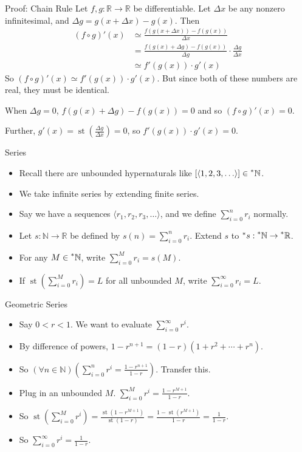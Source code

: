 \documentclass{beamer}
\theoremstyle{plain}
\theoremstyle{definition}
\newcommand{\stp}[1]{\st\left(#1\right)}
\newcommand{\reals}{\mathbb{R}}
\newcommand{\hreals}{\prescript{*}{}{\mathbb{R}}}
\newcommand{\nats}{\mathbb{N}}
\newcommand{\hnats}{\prescript{*}{}{\mathbb{N}}}
\newcommand{\hr}[1]{\prescript{*}{}{#1}}
\DeclareMathOperator{\st}{st}
\begin{document}
\begin{frame}{Proof: Chain Rule}
Let $f,g: \reals \to \reals$ be differentiable. Let $\Delta x$ be any nonzero infinitesimal, and $\Delta g = g(x + \Delta x) - g(x)$. Then
\begin{align*}
(f \circ g)'(x) &\simeq \frac{f(g(x + \Delta x)) - f(g(x))}{\Delta x}  \\
	&= \frac{f(g(x) + \Delta g) - f(g(x))}{\Delta g} \cdot \frac{\Delta g}{\Delta x} \\ 
	&\simeq f'(g(x))\cdot g'(x)
\end{align*}
So $(f \circ g)'(x) \simeq f'(g(x)) \cdot g'(x)$. But since both of these numbers are real, they must be identical.
\vspace{2mm}

When $\Delta g = 0$, $f(g(x) + \Delta g) - f(g(x)) = 0$ and so $(f \circ g)'(x) = 0$. 
\vspace{1mm}

Further, $g'(x) = \stp{\frac{\Delta g}{\Delta x}} = 0$, so $f'(g(x)) \cdot g'(x) = 0$.
\end{frame}

\begin{frame}{Series}
\begin{itemize}
\item Recall there are unbounded hypernaturals like $[\langle 1, 2, 3, \ldots \rangle] \in \hnats$.
\item We take infinite series by extending finite series.
\item Say we have a sequences $\langle r_1, r_2, r_3, \ldots \rangle$, and we define $\sum_{i=0}^n r_i$ normally.
\item Let $s:\nats \to \reals$ be defined by $s(n) = \sum_{i=0}^n r_i$. Extend $s$ to $\hr{s}:\hnats \to \hreals$.
\item For any $M \in \hnats$, write $\sum_{i=0}^M r_i = s(M)$.
\item If $\stp{\sum_{i=0}^M r_i} = L$ for all unbounded $M$, write $\sum_{i=0}^\infty r_i = L$.
\end{itemize}
\end{frame}

\begin{frame}{Geometric Series}
\begin{itemize}
\setlength{\itemsep}{8pt}
\item Say $0 < r < 1$. We want to evaluate $\sum_{i=0}^\infty r^i$.
\item By difference of powers, $1 - r^{n+1} = (1 - r)(1 + r^2 + \cdots + r^n)$.
\item So $(\forall n \in \nats)(\sum_{i=0}^n r^i = \frac{1-r^{n+1}}{1-r})$. Transfer this.
\item Plug in an unbounded $M$. $\sum_{i=0}^M r^i = \frac{1-r^{M+1}}{1-r}$.
\item So $\stp{\sum_{i=0}^M r^i} = \frac{\stp{1 - r^{M+1}}}{\stp{1-r}} = \frac{1 - \stp{r^{M+1}}}{1 - r} = \frac{1}{1-r}$.
\item So $\sum_{i=0}^\infty r^i = \frac{1}{1-r}$.
\end{itemize}
\end{frame}
\end{document}
